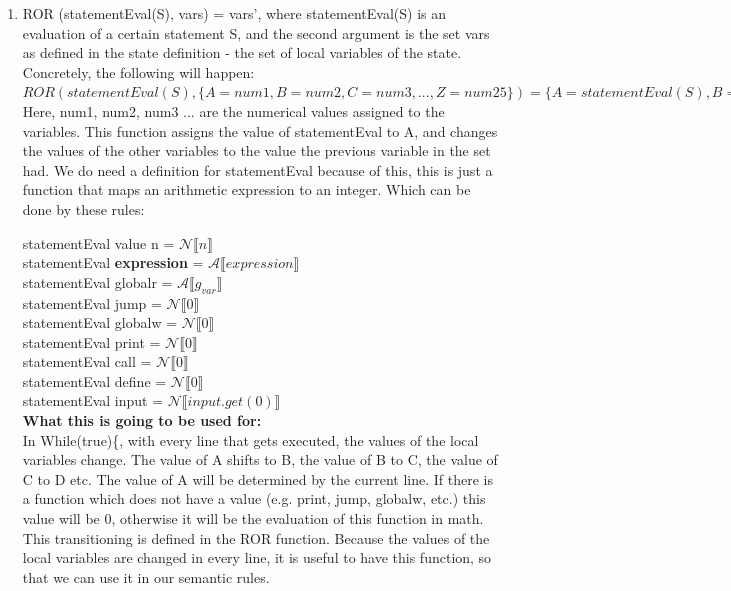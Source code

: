 \documentclass{article}
\begin{document}
\begin{enumerate}
\begin{itemize}
        \end{itemize}
\item ROR (statementEval(S), vars) = vars', where statementEval(S) is an evaluation of a certain statement S, and the second argument is the set vars as defined in the state definition - the set of local variables of the state. \\
Concretely, the following will happen: \\
$ROR(statementEval(S), \{A=num1, B=num2, C=num3, ..., Z=num25\}) = \{A=statementEval(S), B=num1, C=num2, ..., Z=num24\}$\\
Here, num1, num2, num3 ... are the numerical values assigned to the variables. This function assigns the value of statementEval to A, and changes the values of the other variables to the value the previous variable in the set had. We do need a definition for statementEval because of this, this is just a function that maps an arithmetic expression to an integer. Which can be done by these rules: 

statementEval value n = $\mathscr{N}\llbracket n\rrbracket$\\
statementEval \textbf{expression} = $\mathscr{A}\llbracket expression\rrbracket$\\
statementEval globalr = $\mathscr{A}\llbracket g_{var}\rrbracket$\\
statementEval jump = $\mathscr{N}\llbracket 0\rrbracket$\\
statementEval globalw = $\mathscr{N}\llbracket 0\rrbracket$\\
statementEval print = $\mathscr{N}\llbracket 0\rrbracket$\\
statementEval call = $\mathscr{N}\llbracket 0\rrbracket$\\
statementEval define = $\mathscr{N}\llbracket 0\rrbracket$\\
statementEval input = $\mathscr{N}\llbracket input.get(0)\rrbracket$\\



\textbf{What this is going to be used for:}\\
In While(true)\{, with every line that gets executed, the values of the local variables change. The value of A shifts to B, the value of B to C, the value of C to D etc. The value of A will be determined by the current line. If there is a function which does not have a value (e.g. print, jump, globalw, etc.) this value will be 0, otherwise it will be the evaluation of this function in math. This transitioning is defined in the ROR function. Because the values of the local variables are changed in every line, it is useful to have this function, so that we can use it in our semantic rules.\\    
\end{enumerate}
\end{document}
